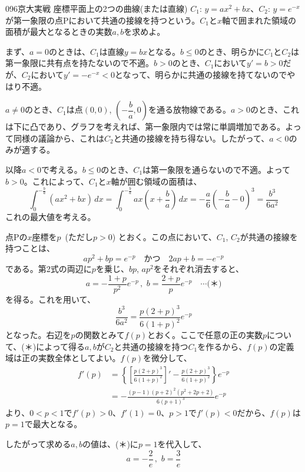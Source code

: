 \begin{prob}{096}{}{京大実戦}
 座標平面上の2つの曲線(または直線) $C_1$: $y=ax^2+bx$、$C_2$: $y=e^{-x}$が第一象限の点Pにおいて共通の接線を持つという。$C_1$と$x$軸で囲まれた領域の面積が最大となるときの実数$a, b$を求めよ。
\end{prob}
まず、$a=0$のときは、$C_1$は直線$y=bx$となる。$b\le 0$のとき、明らかに$C_1$と$C_2$は第一象限に共有点を持たないので不適。$b>0$のとき、$C_1$において$y'=b>0$だが、$C_2$において$y'=-e^{-x}<0$となって、明らかに共通の接線を持てないのでやはり不適。

$a\neq 0$のとき、$C_1$は点$(0,0)$, $\left(-\dfrac{b}{a}, 0\right)$を通る放物線である。$a>0$のとき、これは下に凸であり、グラフを考えれば、第一象限内では常に単調増加である。よって同様の議論から、これは$C_2$と共通の接線を持ち得ない。したがって、$a<0$のみが適する。

以降$a<0$で考える。$b\le 0$のとき、$C_1$は第一象限を通らないので不適。よって$b>0$。これによって、$C_1$と$x$軸が囲む領域の面積は、
\[ \int_0^{-\frac{b}{a}}\! (ax^2+bx) \,dx = \int_0^{-\frac{b}{a}}\! ax\left(x+\frac{b}{a}\right) \,dx = -\frac{a}{6}\left(-\frac{b}{a}-0\right)^3=\frac{b^3}{6a^2} \]
これの最大値を考える。

点Pの$x$座標を$p$~(ただし$p>0$) とおく。この点において、$C_1$, $C_2$が共通の接線を持つことは、
\[ ap^2+bp=e^{-p} \quad\text{かつ}\quad 2ap+b=-e^{-p} \]
である。第2式の両辺に$p$を乗じ、$bp$, $ap^2$をそれぞれ消去すると、
\[ a=-\frac{1+p}{p^2}e^{-p} \,,\,\, b=\frac{2+p}{p}e^{-p} \quad\cdots\text{(＊)} \]
を得る。これを用いて、
\[ \frac{b^3}{6a^2}=\frac{p(2+p)^3}{6(1+p)^2}e^{-p} \]
となった。右辺を$p$の関数とみて$f(p)$とおく。ここで任意の正の実数$p$について、(＊)によって得る$a, b$が$C_2$と共通の接線を持つ$C_1$を作るから、$f(p)$の定義域は正の実数全体としてよい。$f(p)$を微分して、
\begin{align*}
 f'(p)&=\left\{\left[\frac{p(2+p)^3}{6(1+p)^2}\right]'-\frac{p(2+p)^3}{6(1+p)^2}\right\}e^{-p} \\
 &=-\frac{(p-1)(p+2)^2(p^2+2p+2)}{6(p+1)^3}e^{-p}
\end{align*}
より、$0<p<1$で$f'(p)>0$、$f'(1)=0$、$p>1$で$f'(p)<0$だから、$f(p)$は$p=1$で最大となる。

したがって求める$a, b$の値は、(＊)に$p=1$を代入して、
\[ a=-\frac{2}{e} \,,\,\, b=\frac{3}{e} \]